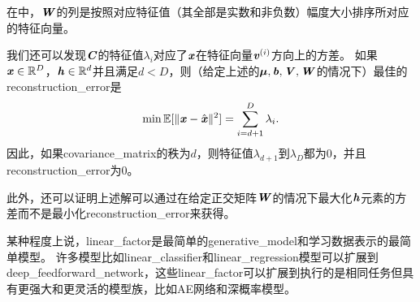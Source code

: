 在中，$\boldsymbol{\mathit{W}}$的列是按照对应特征值（其全部是实数和非负数）幅度大小排序所对应的特征向量。

我们还可以发现$\boldsymbol{\mathit{C}}$的特征值$\lambda_i$对应了$\boldsymbol{\mathit{x}}$在特征向量$\boldsymbol{\mathit{v}}^{(i)}$方向上的方差。
如果$\boldsymbol{\mathit{x}}\in \mathbb{R}^D$，$\boldsymbol{\mathit{h}}\in\mathbb{R}^d$并且满足$d<D$，则（给定上述的${\boldsymbol{\mu}},\boldsymbol{\mathit{b}},\boldsymbol{\mathit{V}},\boldsymbol{\mathit{W}}$的情况下）最佳的\gls{reconstruction_error}是
\begin{align}
\label{eqn:1323}
\min \mathbb{E}[\Vert \boldsymbol{\mathit{x}} - \hat{\boldsymbol{\mathit{x}}} \Vert^2] = \sum_{i=d+1}^{D}\lambda_i.
\end{align}
因此，如果\gls{covariance_matrix}的秩为$d$，则特征值$\lambda_{d+1}$到$\lambda_{D}$都为$0$，并且\gls{reconstruction_error}为$0$。

此外，还可以证明上述解可以通过在给定正交矩阵$\boldsymbol{\mathit{W}}$的情况下最大化$\boldsymbol{\mathit{h}}$元素的方差而不是最小化\gls{reconstruction_error}来获得。


某种程度上说，\gls{linear_factor}是最简单的\gls{generative_model}和学习数据表示的最简单模型。
许多模型比如\gls{linear_classifier}和\gls{linear_regression}模型可以扩展到\gls{deep_feedforward_network}，这些\gls{linear_factor}可以扩展到执行的是相同任务但具有更强大和更灵活的模型族，比如\gls{AE}网络和深概率模型。














